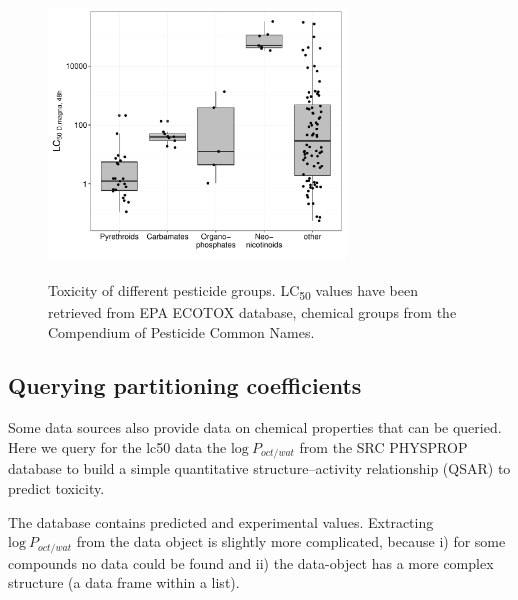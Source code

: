 \begin{figure}[ht]

\begin{knitrout}
\color{fgcolor}

{\centering \includegraphics[width=0.7\textwidth]{chapters/webchem/plot_lc50-1.pdf}
}



\end{knitrout}
\caption[Toxicity of different pesticide groups.]{Toxicity of different pesticide groups. LC\textsubscript{50} values have been retrieved from EPA ECOTOX database, chemical groups from the Compendium of Pesticide Common Names.}
\label{fig:fig2}
\end{figure}


\subsection[Querying partitioning coefficients]{Querying partitioning coefficients}
Some data sources also provide data on chemical properties that can be queried.
Here we query for the lc50 data the $\mathrm{log}~P_{oct/wat}$ from the SRC PHYSPROP database to build a simple quantitative structure–activity relationship (QSAR) to predict toxicity.

\begin{knitrout}
\color{fgcolor}\begin{kframe}
\begin{alltt}
 \hlkwb{<-} \hlopt{$}
\end{alltt}
\end{kframe}
\end{knitrout}

The database contains predicted and experimental values.
Extracting \\ $\mathrm{log}~P_{oct/wat}$ from the data object is slightly more complicated,  
because i) for some compounds no data could be found and ii) the data-object has a more complex structure (a data frame within a list).


